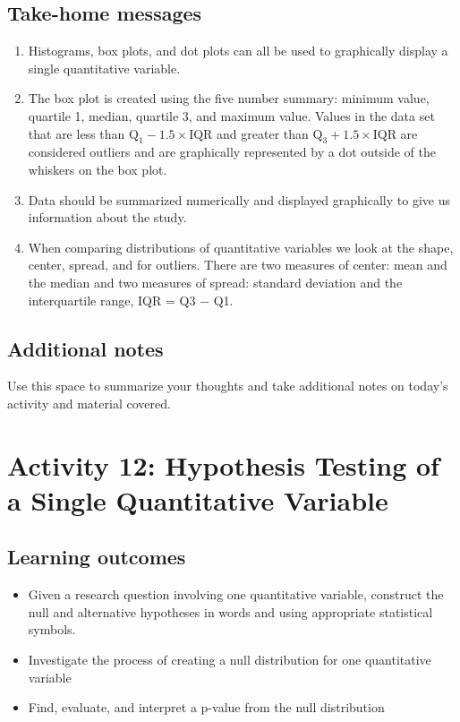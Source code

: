 \documentclass[
]{report}
\begin{document}
\subsection{Take-home messages}\label{take-home-messages}

\begin{enumerate}
\def\labelenumi{\arabic{enumi}.}
\item
  Histograms, box plots, and dot plots can all be used to graphically display a single quantitative variable.
\item
  The box plot is created using the five number summary: minimum value, quartile 1, median, quartile 3, and maximum value. Values in the data set that are less than \(\text{Q}_1 - 1.5\times \text{IQR}\) and greater than \(\text{Q}_3 + 1.5\times \text{IQR}\) are considered outliers and are graphically represented by a dot outside of the whiskers on the box plot.
\item
  Data should be summarized numerically and displayed graphically to give us information about the study.
\item
  When comparing distributions of quantitative variables we look at the shape, center, spread, and for outliers. There are two measures of center: mean and the median and two measures of spread: standard deviation and the interquartile range, IQR = Q3 \(-\) Q1.
\end{enumerate}

\subsection{Additional notes}\label{additional-notes}

Use this space to summarize your thoughts and take additional notes on today's activity and material covered.

\newpage

\section{Activity 12: Hypothesis Testing of a Single Quantitative Variable}\label{activity-12-hypothesis-testing-of-a-single-quantitative-variable}


\subsection{Learning outcomes}\label{learning-outcomes-1}

\begin{itemize}
\item
  Given a research question involving one quantitative variable, construct the null and alternative hypotheses
  in words and using appropriate statistical symbols.
\item
  Investigate the process of creating a null distribution for one quantitative variable
\item
  Find, evaluate, and interpret a p-value from the null distribution
\end{itemize}
\end{document}
